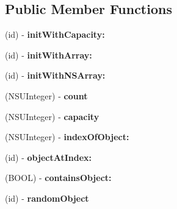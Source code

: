 \subsection*{Public Member Functions}
\begin{DoxyCompactItemize}
\item 
\hypertarget{interface_c_c_array_a8983ade9a550f2988f6264a007a1f368}{(id) -\/ {\bfseries init\-With\-Capacity\-:}}\label{interface_c_c_array_a8983ade9a550f2988f6264a007a1f368}

\item 
\hypertarget{interface_c_c_array_a6f84d1da971af1fa66cc2a4a90520372}{(id) -\/ {\bfseries init\-With\-Array\-:}}\label{interface_c_c_array_a6f84d1da971af1fa66cc2a4a90520372}

\item 
\hypertarget{interface_c_c_array_a57e1865ff1eaf0ae1e23e6e674fe80cf}{(id) -\/ {\bfseries init\-With\-N\-S\-Array\-:}}\label{interface_c_c_array_a57e1865ff1eaf0ae1e23e6e674fe80cf}

\item 
\hypertarget{interface_c_c_array_a0c6d5e102eb377f660064ac93f8fbf39}{(N\-S\-U\-Integer) -\/ {\bfseries count}}\label{interface_c_c_array_a0c6d5e102eb377f660064ac93f8fbf39}

\item 
\hypertarget{interface_c_c_array_a1de491877a6d545ee1d86fdcf5fa53de}{(N\-S\-U\-Integer) -\/ {\bfseries capacity}}\label{interface_c_c_array_a1de491877a6d545ee1d86fdcf5fa53de}

\item 
\hypertarget{interface_c_c_array_a2d26649f71c4f132e995911bcb15a4c6}{(N\-S\-U\-Integer) -\/ {\bfseries index\-Of\-Object\-:}}\label{interface_c_c_array_a2d26649f71c4f132e995911bcb15a4c6}

\item 
\hypertarget{interface_c_c_array_aa92940aae51dcc9091e973e375b0196b}{(id) -\/ {\bfseries object\-At\-Index\-:}}\label{interface_c_c_array_aa92940aae51dcc9091e973e375b0196b}

\item 
\hypertarget{interface_c_c_array_a43b84b0f27466b29f4de8446b2cc8e9f}{(B\-O\-O\-L) -\/ {\bfseries contains\-Object\-:}}\label{interface_c_c_array_a43b84b0f27466b29f4de8446b2cc8e9f}

\item 
\hypertarget{interface_c_c_array_a5407c742baea84e0b5b986a14a6fe81a}{(id) -\/ {\bfseries random\-Object}}\label{interface_c_c_array_a5407c742baea84e0b5b986a14a6fe81a}


\end{DoxyCompactItemize}
